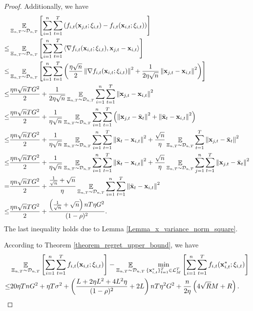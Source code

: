 \documentclass{article}
\begin{document}
\begin{proof}
Additionally, we have
\begin{align}
\nonumber
& \mathop{\mathbb{E}}_{\Xi_{n,T} \sim \mathcal{D}_{n,T}}\left [\sum_{i=1}^n \sum_{t=1}^T \left( f_{i,t}({\bf x}_{j,t};\xi_{i,t}) - f_{i,t}({\bf x}_{i,t};\xi_{i,t}) \right)\right ] \\ \nonumber
\le & \mathop{\mathbb{E}}_{\Xi_{n,T} \sim \mathcal{D}_{n,T}}\left [\sum_{i=1}^n \sum_{t=1}^T \left\langle\nabla f_{i,t}({\bf x}_{i,t};\xi_{i,t}), {\bf x}_{j,t} - {\bf x}_{i,t} \right\rangle\right ] \\ \nonumber
\le & \mathop{\mathbb{E}}_{\Xi_{n,T} \sim \mathcal{D}_{n,T}}\left [\sum_{i=1}^n \sum_{t=1}^T \left(  \frac{\eta\sqrt{n}}{2}\left\lVert\nabla f_{i,t}({\bf x}_{i,t};\xi_{i,t})\right\rVert^2 + \frac{1}{2\eta\sqrt{n}} \left\lVert{\bf x}_{j,t} - {\bf x}_{i,t}\right\rVert^2  \right)\right ] \\ \nonumber
\le & \frac{\eta n\sqrt{n} T G^2}{2} + \frac{1}{2\eta\sqrt{n}} \mathop{\mathbb{E}}_{\Xi_{n,T} \sim \mathcal{D}_{n,T}}\sum_{i=1}^n \sum_{t=1}^T \left\lVert{\bf x}_{j,t} - {\bf x}_{i,t}\right\rVert^2 \\ \nonumber
\le & \frac{\eta n\sqrt{n} T G^2}{2} + \frac{1}{\eta\sqrt{n}} \mathop{\mathbb{E}}_{\Xi_{n,T} \sim \mathcal{D}_{n,T}}\sum_{i=1}^n \sum_{t=1}^T \left(  \left\lVert{\bf x}_{j,t} -\bar{{\bf x}}_t\right\rVert^2 + \left\lVert\bar{{\bf x}}_t - {\bf x}_{i,t}\right\rVert^2 \right) \\ \nonumber
\le & \frac{\eta n\sqrt{n} T G^2}{2} + \frac{1}{\eta\sqrt{n}} \mathop{\mathbb{E}}_{\Xi_{n,T} \sim \mathcal{D}_{n,T}}\sum_{i=1}^n \sum_{t=1}^T \left\lVert\bar{{\bf x}}_t - {\bf x}_{i,t}\right\rVert^2 + \frac{\sqrt{n}}{\eta} \mathop{\mathbb{E}}_{\Xi_{n,T} \sim \mathcal{D}_{n,T}} \sum_{t=1}^T\left\lVert{\bf x}_{j,t} -\bar{{\bf x}}_t\right\rVert^2  \\ \nonumber
\le & \frac{\eta n\sqrt{n} T G^2}{2} + \frac{1}{\eta\sqrt{n}} \mathop{\mathbb{E}}_{\Xi_{n,T} \sim \mathcal{D}_{n,T}}\sum_{i=1}^n \sum_{t=1}^T \left\lVert\bar{{\bf x}}_t - {\bf x}_{i,t}\right\rVert^2 + \frac{\sqrt{n}}{\eta} \mathop{\mathbb{E}}_{\Xi_{n,T} \sim \mathcal{D}_{n,T}} \sum_{j=1}^n\sum_{t=1}^T\left\lVert{\bf x}_{j,t} -\bar{{\bf x}}_t\right\rVert^2  \\ \nonumber
= & \frac{\eta n\sqrt{n} T G^2}{2} + \frac{\frac{1}{\sqrt{n}}+\sqrt{n}}{\eta} \mathop{\mathbb{E}}_{\Xi_{n,T} \sim \mathcal{D}_{n,T}}\sum_{i=1}^n \sum_{t=1}^T \left\lVert\bar{{\bf x}}_t - {\bf x}_{i,t}\right\rVert^2 \\ \label{equa_implied_other_regret_temp1}
\le & \frac{\eta n\sqrt{n} T G^2}{2} + \frac{\left( \frac{1}{\sqrt{n}}+\sqrt{n} \right)nT\eta G^2}{(1-\rho)^2}. 
\end{align} The last inequality holds due to Lemma \ref{Lemma_x_variance_norm_square}.

According to Theorem \ref{theorem_regret_upper_bound}, we have
\begin{align}
\nonumber
& \mathop{\mathbb{E}}_{\Xi_{n,T} \sim \mathcal{D}_{n,T}}\left [\sum_{i=1}^n \sum_{t=1}^T f_{i,t}({\bf x}_{i,t};\xi_{i,t})\right ] - \mathop{\mathbb{E}}_{\Xi_{n,T} \sim \mathcal{D}_{n,T}}\min_{\{{\bf x}_{i,t}^\ast\}_{t=1}^T \in {\mathcal{L}}_M^T}\left [\sum_{i=1}^n \sum_{t=1}^T f_{i,t}({\bf x}_{i,t}^\ast;\xi_{i,t})\right ] \\ \label{equa_implied_other_regret_temp2}
\le & 20\eta T n G^2 +  \eta T\sigma^2 + \left( \frac{L + 2\eta L^2  + 4L^2 \eta}{(1-\rho)^2} +2L \right)  nT\eta^2 G^2    + \frac{n}{2\eta}\left(  4\sqrt{R}M + R   \right).
\end{align}


\end{proof}
\end{document}
